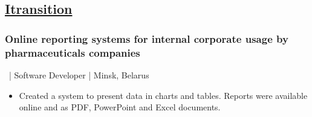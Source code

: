 \documentclass[a4paper,11pt]{article}
\newcommand{\periodandlocation}[1]{{\small #1}}
\begin{document}
\begin{minipage}[t]{0.55\textwidth}
    \subsection*{\href{http://www.itransition.com/}{Itransition}}
	\subsubsection*{Online reporting systems for internal corporate usage by pharmaceuticals companies}
    \periodandlocation{\ | Software Developer | Minsk, Belarus}
    \begin{itemize}
      \item Created a system to present data in charts and tables. Reports were available online and as PDF, PowerPoint and Excel documents.
    \end{itemize}
  \end{minipage}
\end{document}
